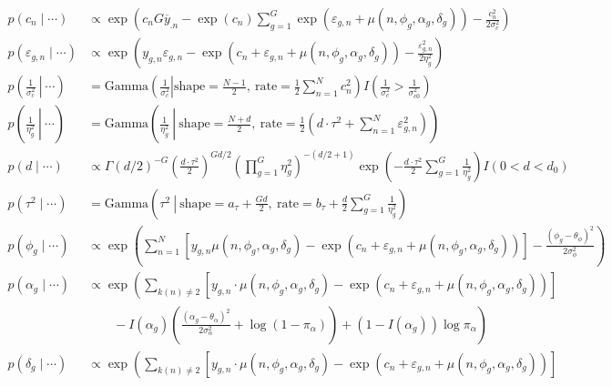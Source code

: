\documentclass{article}\usepackage{graphicx, color}
\providecommand{\e}{\varepsilon}
\providecommand{\ov}[1]{\overline{#1}}
\begin{document}
\begin{flushleft}
\begin{align*}
p(c_n \mid \cdots) &\propto \exp \left (c_n G\ov{y}_{.n}  -\exp(c_n) \sum_{g = 1}^G \exp( \e_{g, n} + \mu(n, \phi_g, \alpha_g, \delta_g)) - \frac{c_n^2}{2 \sigma_c^2} \right ) \\
p (\e_{g, n} \mid \cdots) &\propto \exp \left (y_{g, n} \e_{g, n} - \exp(c_n + \e_{g, n} + \mu(n, \phi_g, \alpha_g, \delta_g))  - \frac{\e_{g, n}^2}{2 \eta_g^2} \right) \\
p \left ( \left . \frac{1}{\sigma_c^2}  \ \right \rvert  \ \cdots \right) &= \text{Gamma} \left ( \left . \frac{1}{\sigma_c^2} \right  |\text{shape} = \frac{N - 1}{2}, \ \text{rate} =\frac{1}{2} {\sum_{n = 1}^N c_n^2} \right )  I \left (\frac{1}{\sigma_c^2} > \frac{1}{\sigma_{c0}^2} \right ) \\
p \left ( \left . \frac{1}{\eta_g^2} \ \right \rvert \  \cdots \right ) &= \text{Gamma} \left ( \left . \frac{1}{\eta_g^2} \ \right \rvert  \ \text{shape} = \frac{N + d}{2}, \  \text{rate} = \frac{1}{2} \left ( d \cdot \tau^2 + \sum_{n  =1}^N \e_{g, n}^2 \right ) \right ) \\
p(d \mid \cdots) &\propto \Gamma \left( d/2 \right )^{-G} \left ( \frac{d \cdot \tau^2}{2}\right ) ^ { G d  /2 } \left ( \prod_{g = 1}^G { \eta_g^2} \right )^{ -(d/2 + 1)} \exp \left (- \frac{d \cdot \tau^2}{2} \sum_{g = 1}^G \frac{1}{ \eta_g^2} \right ) I(0 < d < d_0) \\
p(\tau^2 \mid \cdots) &= \text{Gamma} \left ( \tau^2 \ \left \lvert \ \text{shape} =  a_\tau + \frac{Gd}{2} \right ., \ \text{rate} =  b_\tau + \frac{d}{2} \sum_{g = 1}^G \frac{1}{\eta_g^2} \right ) \\
p(\phi_g \mid \cdots) & \propto \exp \left (\sum_{n = 1}^N \left [y_{g, n} \mu(n, \phi_g, \alpha_g, \delta_g)  - \exp (c_n + \e_{g, n} + \mu(n, \phi_g, \alpha_g, \delta_g)) \right ] - \frac{(\phi_g - \theta_\phi)^2}{2 \sigma_\phi^2} \right ) \\
p(\alpha_g \mid \cdots) &\propto \exp \left ( \sum_{k(n) \ne 2} \left [ y_{g, n} \cdot \mu(n, \phi_g, \alpha_g, \delta_g) - \exp(c_n + \e_{g, n} + \mu(n, \phi_g, \alpha_g, \delta_g)) \right ] \right . \\
&\left .  \qquad - I(\alpha_g) \left ( \frac{(\alpha_g - \theta_\alpha)^2}{2 \sigma_\alpha^2} + \log( 1 - \pi_\alpha) \right ) + (1 - I(\alpha_g)) \log \pi_\alpha  \right ) \\
p(\delta_g \mid \cdots) &\propto  \exp \left ( \sum_{k(n) \ne 2} \left [ y_{g, n} \cdot \mu(n, \phi_g, \alpha_g, \delta_g) - \exp(c_n + \e_{g, n} + \mu(n, \phi_g, \alpha_g, \delta_g)) \right ] \right . \\

\end{align*}
\end{flushleft}
\end{document}
